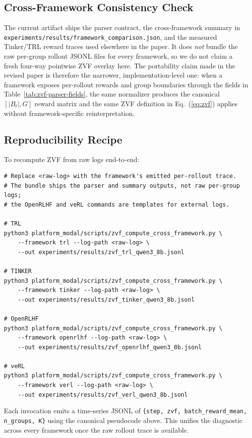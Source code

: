\subsection{Cross-Framework Consistency Check}

The current \artifactstatusword{} artifact ships the parser contract, the
cross-framework summary in
\texttt{experiments/results/framework\_comparison.json}, and the measured
Tinker/TRL reward traces used elsewhere in the paper. It does
\emph{not} bundle the raw per-group rollout JSONL files for every framework,
so we do not claim a fresh four-way pointwise ZVF overlay here. The
portability claim made in the revised paper is therefore the narrower,
implementation-level one: when a framework exposes per-rollout rewards and
group boundaries through the fields in Table~\ref{tab:zvf-parser-fields},
the same normalizer produces the canonical $[|B_t|, G]$ reward matrix and
the same ZVF definition in Eq.~(\ref{eq:zvf}) applies without
framework-specific reinterpretation.

\subsection{Reproducibility Recipe}

To recompute ZVF from raw logs end-to-end:
\begin{verbatim}
# Replace <raw-log> with the framework's emitted per-rollout trace.
# The bundle ships the parser and summary outputs, not raw per-group logs;
# the OpenRLHF and veRL commands are templates for external logs.

# TRL
python3 platform_modal/scripts/zvf_compute_cross_framework.py \
    --framework trl --log-path <raw-log> \
    --out experiments/results/zvf_trl_qwen3_8b.jsonl

# TINKER
python3 platform_modal/scripts/zvf_compute_cross_framework.py \
    --framework tinker --log-path <raw-log> \
    --out experiments/results/zvf_tinker_qwen3_8b.jsonl

# OpenRLHF
python3 platform_modal/scripts/zvf_compute_cross_framework.py \
    --framework openrlhf --log-path <raw-log> \
    --out experiments/results/zvf_openrlhf_qwen3_8b.jsonl

# veRL
python3 platform_modal/scripts/zvf_compute_cross_framework.py \
    --framework verl --log-path <raw-log> \
    --out experiments/results/zvf_verl_qwen3_8b.jsonl
\end{verbatim}
Each invocation emits a time-series JSONL of
\texttt{\{step, zvf, batch\_reward\_mean, n\_groups, K\}} using the
canonical pseudocode above. This unifies the diagnostic across every
framework once the raw rollout trace is available.
